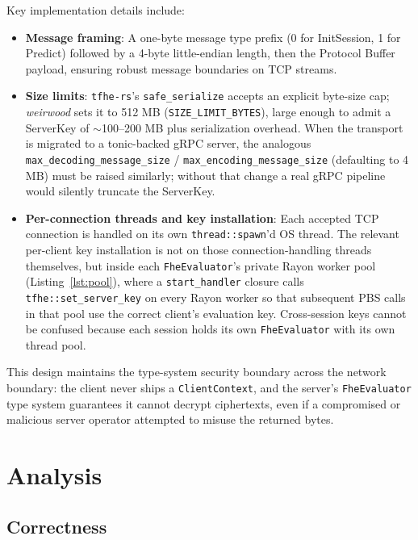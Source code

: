 \documentclass[12pt]{article}
\begin{document}
Key implementation details include:
\begin{itemize}
\item \textbf{Message framing}: A one-byte message type prefix (0 for InitSession, 1 for Predict) followed by a 4-byte little-endian length, then the Protocol Buffer payload, ensuring robust message boundaries on TCP streams.
\item \textbf{Size limits}: \texttt{tfhe-rs}'s \texttt{safe\_serialize} accepts an explicit byte-size cap; \textit{weirwood} sets it to 512 MB (\texttt{SIZE\_LIMIT\_BYTES}), large enough to admit a ServerKey of $\sim$100--200 MB plus serialization overhead. When the transport is migrated to a tonic-backed gRPC server, the analogous \texttt{max\_decoding\_message\_size} / \texttt{max\_encoding\_message\_size} (defaulting to 4 MB) must be raised similarly; without that change a real gRPC pipeline would silently truncate the ServerKey.
\item \textbf{Per-connection threads and key installation}: Each accepted TCP connection is handled on its own \texttt{thread::spawn}'d OS thread. The relevant per-client key installation is not on those connection-handling threads themselves, but inside each \texttt{FheEvaluator}'s private Rayon worker pool (Listing~\ref{lst:pool}), where a \texttt{start\_handler} closure calls \texttt{tfhe::set\_server\_key} on every Rayon worker so that subsequent PBS calls in that pool use the correct client's evaluation key. Cross-session keys cannot be confused because each session holds its own \texttt{FheEvaluator} with its own thread pool.
\end{itemize}

This design maintains the type-system security boundary across the network boundary: the client never ships a \texttt{ClientContext}, and the server's \texttt{FheEvaluator} type system guarantees it cannot decrypt ciphertexts, even if a compromised or malicious server operator attempted to misuse the returned bytes.

\section{Analysis}

\subsection{Correctness}
\end{document}
